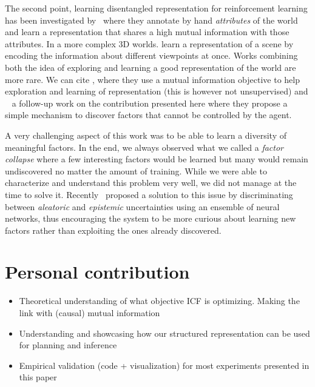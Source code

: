 The second point, learning disentangled representation for reinforcement
learning has been investigated by~\citet{anand2019unsupervised} where they
annotate by hand \emph{attributes} of the world and learn a representation that
shares a high mutual information with those attributes. In a more complex 3D
worlds. \citet{eslami2018neural} learn a representation of a scene by encoding the information about different viewpoints at once. Works combining both the idea of exploring and learning a good representation of the world are more rare. We can cite \citet{kim2019emi}, where they use a mutual information objective to help exploration and learning of representation (this is however not unsupervised) and ~\citet{li2018disentangled} a follow-up work on the contribution presented here where they propose a simple mechanism to discover factors that cannot be controlled by the agent.

A very challenging aspect of this work was to be able to learn a diversity of meaningful factors. In the end, we always observed what we called a \emph{factor collapse} where a few interesting factors would be learned but many would remain undiscovered no matter the amount of training. While we were able to characterize and understand this problem very well, we did not manage at the time to solve it. Recently~\citet{strouse2021learning} proposed a solution to this issue by discriminating between \emph{aleatoric} and \emph{epistemic} uncertainties using an ensemble of neural networks, thus encouraging the system to be more curious about learning new factors rather than exploiting the ones already discovered.

\section*{Personal contribution}
\begin{itemize}
    \item Theoretical understanding of what objective ICF is optimizing. Making the link with (causal) mutual information
    \item Understanding and showcasing how our structured representation can be used for planning and inference
    \item Empirical validation (code + visualization) for most experiments presented in this paper
\end{itemize}

\newpage


